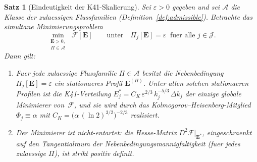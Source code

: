 \documentclass[12pt,a4paper]{article}
\theoremstyle{definition}
\theoremstyle{plain}
\newtheorem{theorem}[definition]{Satz}
\theoremstyle{remark}
\begin{document}
\begin{theorem}[Eindeutigkeit der K41-Skalierung]\label{thm:K41}
Sei $\varepsilon > 0$ gegeben und sei $\mathscr{A}$ die Klasse der
zulaessigen Flussfamilien (Definition~\ref{def:admissible}).
Betrachte das \emph{simultane} Minimierungsproblem
\begin{equation}\label{eq:min}
  \min_{\substack{\mathbf{E} > 0,\\ \Pi \in \mathscr{A}}}
  \;\mathcal{F}[\mathbf{E}]
  \qquad \text{unter} \quad
  \Pi_j[\mathbf{E}] = \varepsilon
  \;\;\text{fuer alle } j \in \mathcal{J}.
\end{equation}
Dann gilt:
\begin{enumerate}
  \item[\textup{(i)}]
    Fuer \emph{jede} zulaessige Flussfamilie $\Pi \in \mathscr{A}$ besitzt
    die Nebenbedingung $\Pi_j[\mathbf{E}] = \varepsilon$ ein stationaeres
    Profil $\mathbf{E}^{(\Pi)}$. Unter allen solchen stationaeren Profilen
    ist die K41-Verteilung
    $E_j^* = C_K\,\varepsilon^{2/3}\,k_j^{-5/3}\,\Delta k_j$
    der einzige globale Minimierer von~$\mathcal{F}$, und sie wird
    durch das Kolmogorov--Heisenberg-Mitglied $\Phi_j \equiv \alpha$ mit
    $C_K = \bigl(\alpha\,(\ln 2)^{3/2}\bigr)^{-2/3}$ realisiert.
  \item[\textup{(ii)}]
    Der Minimierer ist nicht-entartet: die Hesse-Matrix
    $D^2\mathcal{F}|_{\mathbf{E}^*}$, eingeschraenkt auf den Tangentialraum
    der Nebenbedingungsmannigfaltigkeit (fuer jedes zulaessige $\Pi$), ist
    strikt positiv definit.
\end{enumerate}
\end{theorem}
\end{document}
